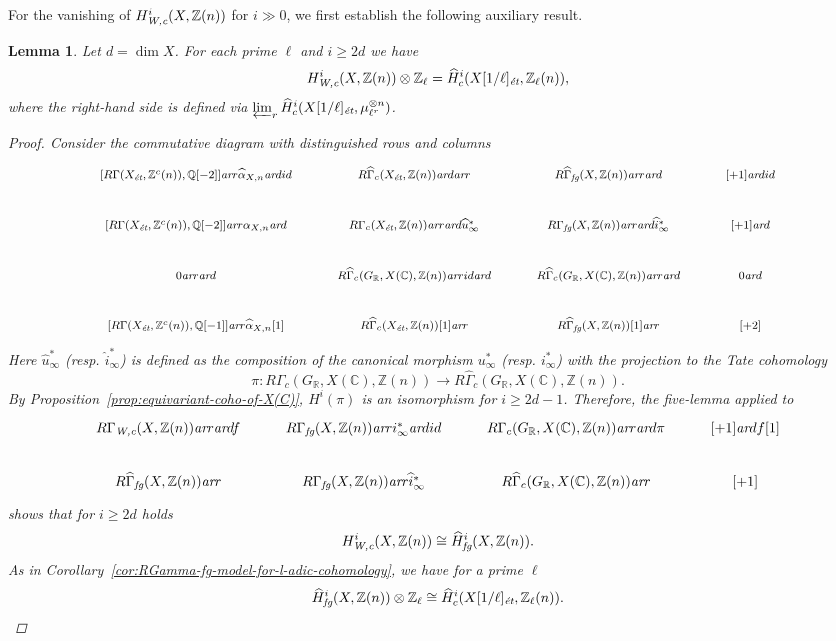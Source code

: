 \documentclass[leqno,12pt]{article}
\theoremstyle{plain}
\newtheorem{lemma}[theorem]{\indent\sc Lemma}
\theoremstyle{definition}
\newcommand{\CC}{\mathbb{C}}
\newcommand{\QQ}{\mathbb{Q}}
\newcommand{\RR}{\mathbb{R}}
\newcommand{\ZZ}{\mathbb{Z}}
\newcommand{\Wc}{\text{\it W,c}}
\newcommand{\ar}{\text{\it ar}}
\newcommand{\et}{\text{\it \'{e}t}}
\newcommand{\fg}{\text{\it fg}}
\begin{document}
For the vanishing of $H^i_\Wc (X, \ZZ(n))$ for $i \gg 0$, we first establish the
following auxiliary result.

\begin{lemma}
  Let $d = \dim X$. For each prime $\ell$ and $i \ge 2d$ we have
  \begin{equation}
    \label{eqn:l-adic-completion-of-H-Wc}
    H^i_\Wc (X, \ZZ (n)) \otimes \ZZ_\ell =
    \widehat{H}_c^i (X [1/\ell]_\et, \ZZ_\ell (n)),
  \end{equation}
  where the right-hand side is defined via
  $\varprojlim_r \widehat{H}_c^i (X [1/\ell]_\et, \mu_{\ell^r}^{\otimes n})$.

  \begin{proof}
    Consider the commutative diagram with distinguished rows and columns
    \[ \begin{tikzcd}[font=\footnotesize]
        {[R\Gamma (X_\et, \ZZ^c(n)), \QQ[-2]]} \ar{r}{\widehat{\alpha}_{X,n}} \ar{d}{id} & R\widehat{\Gamma}_c (X_\et, \ZZ(n)) \ar{d} \ar{r} & R\widehat{\Gamma}_\fg (X, \ZZ(n)) \ar{r}\ar{d} & {[+1]} \ar{d}{id} \\
        {[R\Gamma (X_\et, \ZZ^c(n)), \QQ[-2]]} \ar{r}{\alpha_{X,n}} \ar{d} & R\Gamma_c (X_\et, \ZZ(n)) \ar{r} \ar{d}{\widehat{u}^*_\infty} & R\Gamma_\fg (X, \ZZ(n)) \ar{r} \ar{d}{\widehat{i}^*_\infty} & {[+1]} \ar{d} \\
        0 \ar{r}\ar{d} & R\widehat{\Gamma}_c (G_\RR, X(\CC), \ZZ(n)) \ar{r}{id} \ar{d} & R\widehat{\Gamma}_c (G_\RR, X(\CC), \ZZ(n)) \ar{r} \ar{d} & 0 \ar{d} \\
        {[R\Gamma (X_\et, \ZZ^c(n)), \QQ[-1]]} \ar{r}{\widehat{\alpha}_{X,n} [1]} & R\widehat{\Gamma}_c (X_\et, \ZZ(n)) [1] \ar{r} & R\widehat{\Gamma}_\fg (X, \ZZ(n)) [1] \ar{r} & {[+2]}
      \end{tikzcd} \]
    Here $\widehat{u}^*_\infty$ (resp. $\widehat{i}^*_\infty$) is defined as the
    composition of the canonical morphism $u^*_\infty$ (resp. $i^*_\infty$) with
    the projection to the Tate cohomology
    \[ \pi\colon R\Gamma_c (G_\RR, X(\CC), \ZZ(n)) \to
      R\widehat{\Gamma}_c (G_\RR, X(\CC), \ZZ(n)). \]
    By Proposition~\ref{prop:equivariant-coho-of-X(C)}, $H^i (\pi)$ is an
    isomorphism for $i \ge 2d-1$. Therefore, the five-lemma applied to
    \[ \begin{tikzcd}
        R\Gamma_\Wc (X, \ZZ(n)) \ar{r}\ar{d}{f} & R\Gamma_\fg (X, \ZZ(n)) \ar{r}{i^*_\infty}\ar{d}{id} & R\Gamma_c (G_\RR, X(\CC), \ZZ(n)) \ar{r}\ar{d}{\pi} & {[+1]}\ar{d}{f [1]} \\
        R\widehat{\Gamma}_\fg (X, \ZZ(n)) \ar{r} & R\Gamma_\fg (X, \ZZ(n)) \ar{r}{\widehat{i}^*_\infty} & R\widehat{\Gamma}_c (G_\RR, X(\CC), \ZZ(n)) \ar{r} & {[+1]}
      \end{tikzcd} \]
    shows that for $i \ge 2d$ holds
    \[ H^i_\Wc (X, \ZZ(n)) \cong \widehat{H}^i_\fg (X, \ZZ(n)). \]
    As in Corollary~\ref{cor:RGamma-fg-model-for-l-adic-cohomology}, we have for a
    prime $\ell$
    \[ \widehat{H}^i_\fg (X, \ZZ(n)) \otimes \ZZ_\ell \cong \widehat{H}^i_c (X[1/\ell]_\et, \ZZ_\ell (n)). \qedhere \]
  \end{proof}
\end{lemma}
\end{document}
